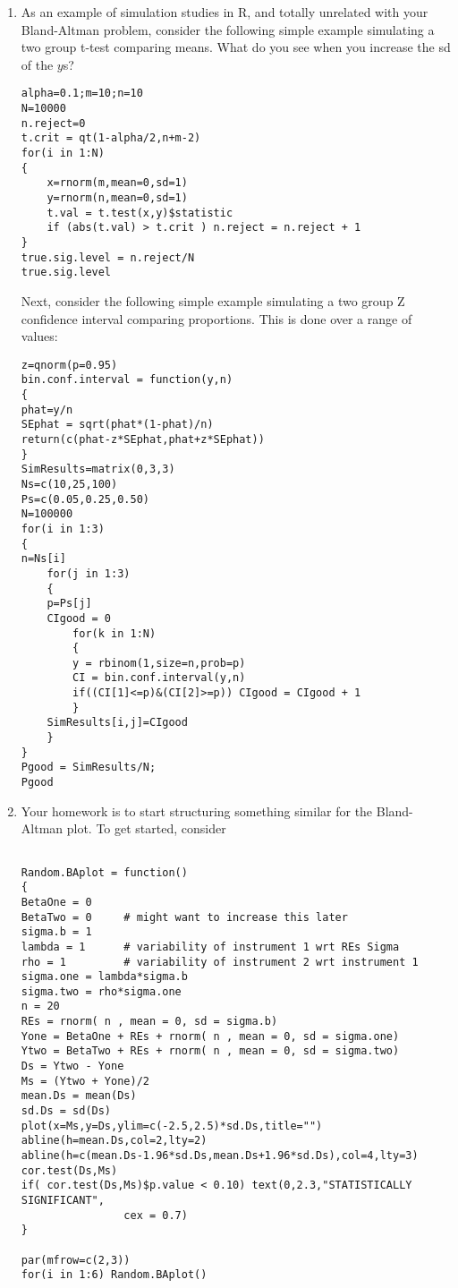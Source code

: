 \documentclass[12pt, a4paper]{article}
\begin{document}
\begin{enumerate}
\item As an example of simulation studies in \textsf{R}, and
totally unrelated with your Bland-Altman problem, consider the
following simple example simulating a two group t-test comparing
means. What do you see when you increase the sd of the $y$s?
\begin{verbatim}
alpha=0.1;m=10;n=10
N=10000
n.reject=0
t.crit = qt(1-alpha/2,n+m-2)
for(i in 1:N)
{
    x=rnorm(m,mean=0,sd=1)
    y=rnorm(n,mean=0,sd=1)
    t.val = t.test(x,y)$statistic
    if (abs(t.val) > t.crit ) n.reject = n.reject + 1
}
true.sig.level = n.reject/N
true.sig.level
\end{verbatim}

Next, consider the following simple example simulating a two group
Z confidence interval comparing proportions. This is done over a
range of values:

\begin{verbatim}
z=qnorm(p=0.95)
bin.conf.interval = function(y,n)
{
phat=y/n
SEphat = sqrt(phat*(1-phat)/n)
return(c(phat-z*SEphat,phat+z*SEphat))
}
SimResults=matrix(0,3,3)
Ns=c(10,25,100)
Ps=c(0.05,0.25,0.50)
N=100000
for(i in 1:3)
{
n=Ns[i]
    for(j in 1:3)
    {
    p=Ps[j]
    CIgood = 0
        for(k in 1:N)
        {
        y = rbinom(1,size=n,prob=p)
        CI = bin.conf.interval(y,n)
        if((CI[1]<=p)&(CI[2]>=p)) CIgood = CIgood + 1
        }
    SimResults[i,j]=CIgood
    }
}
Pgood = SimResults/N;
Pgood
\end{verbatim}


\item Your homework is to start structuring something similar for
the Bland-Altman plot. To get started, consider


\begin{verbatim}

Random.BAplot = function()
{
BetaOne = 0
BetaTwo = 0     # might want to increase this later
sigma.b = 1
lambda = 1      # variability of instrument 1 wrt REs Sigma
rho = 1         # variability of instrument 2 wrt instrument 1
sigma.one = lambda*sigma.b
sigma.two = rho*sigma.one
n = 20
REs = rnorm( n , mean = 0, sd = sigma.b)
Yone = BetaOne + REs + rnorm( n , mean = 0, sd = sigma.one)
Ytwo = BetaTwo + REs + rnorm( n , mean = 0, sd = sigma.two)
Ds = Ytwo - Yone
Ms = (Ytwo + Yone)/2
mean.Ds = mean(Ds)
sd.Ds = sd(Ds)
plot(x=Ms,y=Ds,ylim=c(-2.5,2.5)*sd.Ds,title="")
abline(h=mean.Ds,col=2,lty=2)
abline(h=c(mean.Ds-1.96*sd.Ds,mean.Ds+1.96*sd.Ds),col=4,lty=3)
cor.test(Ds,Ms)
if( cor.test(Ds,Ms)$p.value < 0.10) text(0,2.3,"STATISTICALLY SIGNIFICANT",
                cex = 0.7)
}

par(mfrow=c(2,3))
for(i in 1:6) Random.BAplot()

\end{verbatim}



\end{enumerate}


\clearpage


\end{document}

